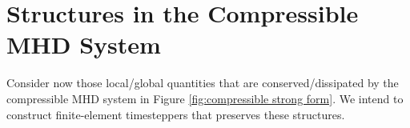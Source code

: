 \section{Structures in the Compressible MHD System}\label{cha:structures}
    Consider now those local/global quantities that are conserved/dissipated by the compressible MHD system in Figure \ref{fig:compressible strong form}. We intend to construct finite-element timesteppers that preserves these structures.


    
    
    